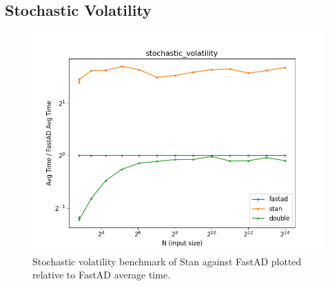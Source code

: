 \subsection{Stochastic Volatility}\label{ssec:stochastic_volatility}

\begin{figure}[t]
    \centering
    \includegraphics[width=\textwidth]{figs/stochastic_volatility_fig.png}
    \caption{%
        Stochastic volatility benchmark of Stan against FastAD 
        plotted relative to FastAD average time.
    }\label{fig:stochastic_volatility}
\end{figure}

